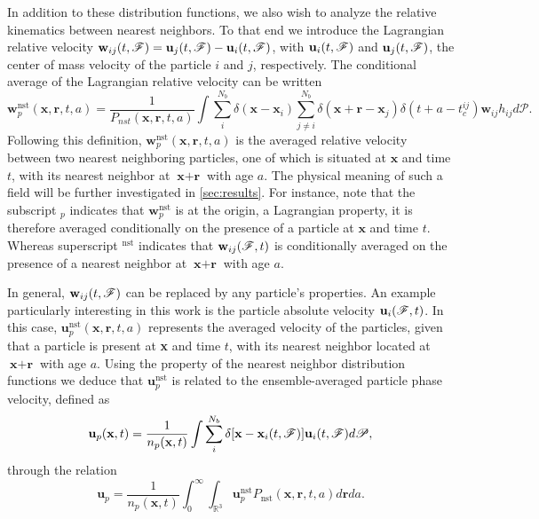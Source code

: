 In addition to these distribution functions, we also wish to analyze the relative kinematics between nearest neighbors. 
To that end we introduce the Lagrangian relative velocity $\textbf{w}_{ij}(t,\mathscr{F}) = \textbf{u}_j(t,\mathscr{F}) - \textbf{u}_i(t,\mathscr{F})$, with $\textbf{u}_i(t,\mathscr{F})$ and $\textbf{u}_j(t,\mathscr{F})$, the center of mass velocity of the particle $i$ and $j$, respectively.
The conditional average of the Lagrangian relative velocity can be written
\begin{equation*}
    \textbf{w}^\text{nst}_p (\textbf{x},\textbf{r},t,a)
    = 
    \frac{1}{P_{nst}(\textbf{x},\textbf{r},t,a)}
    \int \sum_{i}^{N_b}\delta(\textbf{x}-\textbf{x}_i)
    \sum_{j\neq i}^{N_b}\delta(\textbf{x}+\textbf{r}-\textbf{x}_j) 
    \delta(t+a-t_c^{ij}) 
    \textbf{w}_{ij}
    h_{ij} 
    d\mathscr{P}.
    \label{eq:q_nstij}
\end{equation*}
Following this definition, $\textbf{w}^\text{nst}_p(\textbf{x},\textbf{r},t,a)$ is the averaged relative velocity between two nearest neighboring particles, one of which is situated at $\textbf{x}$ and time $t$, with its nearest neighbor at $\textbf{x}+\textbf{r}$ with age $a$. 
The physical meaning of such a field will be further investigated in \ref{sec:results}. 
For instance, note that the subscript $_p$ indicates that $\textbf{w}^\text{nst}_p$ is at the origin, a Lagrangian property, it is therefore averaged conditionally on the presence of a particle at $\textbf{x}$ and time $t$. 
Whereas superscript $^\text{nst}$ indicates that $\textbf{w}_{ij}(\mathscr{F},t)$ is conditionally averaged on the presence of a nearest neighbor at $\textbf{x}+\textbf{r}$ with age $a$. 

In general, $\textbf{w}_{ij}(t,\mathscr{F})$ can be replaced by any particle's properties. 
An example particularly interesting in this work is the particle absolute velocity $\textbf{u}_i(\mathscr{F},t)$.
In this case, $\textbf{u}^\text{nst}_p(\textbf{x},\textbf{r},t,a)$ represents the averaged velocity of the particles, given that a particle is present at \textbf{x} and time $t$, with its nearest neighbor located at $\textbf{x}+\textbf{r}$ with age $a$. 
Using the property of the nearest neighbor distribution functions we deduce that  $\textbf{u}^\text{nst}_p$ is related to the ensemble-averaged particle phase velocity, defined as 
\begin{equation*}
    \textbf{u}_p(\textbf{x},t)=\frac{1}{n_p(\textbf{x},t)} 
    \int \sum_{i}^{N_b}\delta[\textbf{x}-\textbf{x}_i(t,\mathscr{F})]  \textbf{u}_i(t,\mathscr{F})d\mathscr{P},
\end{equation*}
through the relation
\begin{equation}
    \textbf{u}_p = \frac{1}{n_p(\textbf{x},t)} \int_0^\infty \int_{\mathbb{R}^3} \textbf{u}_p^\text{nst} P_\text{nst}(\textbf{x},\textbf{r},t,a) d\textbf{r} da. 
    \label{eq:u_p}
\end{equation}




